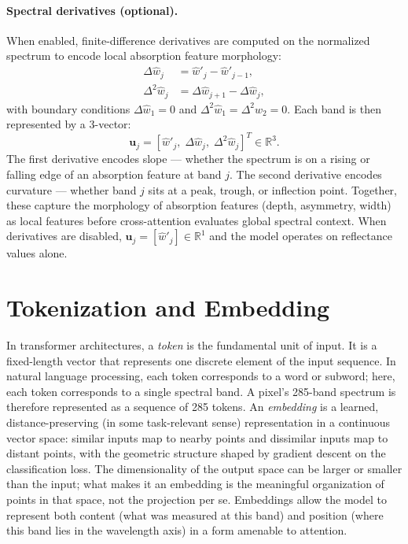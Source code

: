 \documentclass[11pt]{report}
\newcommand{\R}{\mathbb{R}}
\begin{document}
\paragraph{Spectral derivatives (optional).}
When enabled, finite-difference derivatives are computed on the normalized spectrum to encode local absorption feature morphology:
\begin{align}
\Delta\hat{w}_j &= \hat{w}'_j - \hat{w}'_{j-1}, \label{eq:first_deriv} \\
\Delta^2\hat{w}_j &= \Delta\hat{w}_{j+1} - \Delta\hat{w}_j, \label{eq:second_deriv}
\end{align}
with boundary conditions $\Delta\hat{w}_1 = 0$ and $\Delta^2\hat{w}_1 = \Delta^2\hat{w}_2 = 0$. Each band is then represented by a 3-vector:
\begin{equation}
\mathbf{u}_j = [\hat{w}'_j, \; \Delta\hat{w}_j, \; \Delta^2\hat{w}_j]^T \in \R^3.
\label{eq:deriv_vector}
\end{equation}
The first derivative encodes slope --- whether the spectrum is on a rising or falling edge of an absorption feature at band $j$. 
The second derivative encodes curvature --- whether band $j$ sits at a peak, trough, or inflection point. 
Together, these capture the morphology of absorption features (depth, asymmetry, width) as local features before cross-attention evaluates global spectral context. 
When derivatives are disabled, $\mathbf{u}_j = [\hat{w}'_j] \in \R^1$ and the model operates on reflectance values alone.

\section{Tokenization and Embedding}
\label{sec:tokenization}

In transformer architectures, a \emph{token} is the fundamental unit of input.
It is a fixed-length vector that represents one discrete element of the input sequence. 
In natural language processing, each token corresponds to a word or subword; 
here, each token corresponds to a single spectral band. 
A pixel's 285-band spectrum is therefore represented as a sequence of 285 tokens. 
An \emph{embedding} is a learned, distance-preserving (in some task-relevant sense) representation in a continuous vector space: similar inputs map to nearby points and dissimilar inputs map to distant points, with the geometric structure shaped by gradient descent on the classification loss. The dimensionality of the output space can be larger or smaller than the input; what makes it an embedding is the meaningful organization of points in that space, not the projection per se.
Embeddings allow the model to represent both content (what was measured at this band) and position (where this band lies in the wavelength axis) in a form amenable to attention.
\end{document}
